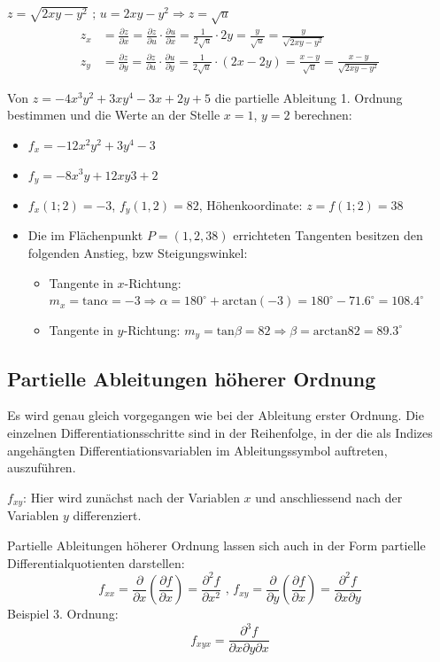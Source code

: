 \begin{bsp}
$z = \sqrt{2xy -y^2} \text{ ;  } u = 2xy - y^2 \Rightarrow z = \sqrt{u}$
\begin{align*}
	z_x &= \frac{\partial z}{\partial x} = \frac{\partial z}{\partial u} \cdot \frac{\partial u}{\partial x} = \frac{1}{2 \sqrt{u}} \cdot 2y = \frac{y}{\sqrt{u}} = \frac{y}{\sqrt{2xy-y^2}} \\
	z_y &= \frac{\partial z}{\partial y} = \frac{\partial z}{\partial u} \cdot \frac{\partial u}{\partial y} = \frac{1}{2 \sqrt{u}} \cdot (2x-2y) = \frac{x-y}{\sqrt{u}} = \frac{x-y}{\sqrt{2xy-y^2}}
\end{align*}
\end{bsp}

\begin{bsp}
Von  $ z = -4x^3y^2 + 3xy^4 - 3x +2y +5$ die partielle Ableitung 1. Ordnung bestimmen und die Werte an der Stelle $x=1$, $y=2$ berechnen:
\begin{itemize}
		\item $f_x= -12x^2y^2+3y^4-3$
		\item $f_y = -8x^3y + 12xy3 +2$
		\item $f_x(1;2) = -3$, $f_y(1,2) = 82$, Höhenkoordinate: $z = f(1;2) = 38$
		\item Die im Flächenpunkt $P = (1, 2, 38)$ errichteten Tangenten besitzen den folgenden Anstieg, bzw Steigungswinkel:
		\begin{itemize}
			\item Tangente in $x$-Richtung: $m_x = \text{tan} \alpha = -3 \Rightarrow \alpha = 180^\circ + \text{arctan}(-3) = 180^\circ - 71.6^\circ = 108.4^\circ$
			\item Tangente in $y$-Richtung: $m_y =  \text{tan} \beta = 82 \Rightarrow \beta = \text{arctan} 82 = 89.3^\circ$
		\end{itemize}
\end{itemize}
\end{bsp}

\subsection{Partielle Ableitungen höherer Ordnung}
\begin{definition}
Es wird genau gleich vorgegangen wie bei der Ableitung erster Ordnung. Die einzelnen Differentiationsschritte sind in der Reihenfolge, in der die als Indizes angehängten Differentiationsvariablen im Ableitungssymbol auftreten, auszuführen. 

$f_{xy}$: Hier wird zunächst nach der Variablen $x$ und anschliessend nach der Variablen $y$ differenziert.

Partielle Ableitungen höherer Ordnung lassen sich auch in der Form partielle Differentialquotienten darstellen:
$$
f_{xx} = \frac{\partial}{\partial x} \left( \frac{\partial f}{\partial x} \right) = \frac{\partial^2 f}{\partial x^2} 
\text{ , } 
f_{xy} = \frac{\partial}{\partial y} \left( \frac{\partial f}{\partial x} \right) = \frac{\partial^2 f}{\partial x \partial y} 
$$
Beispiel 3. Ordnung:
$$ f_{xyx} = \frac{\partial^3 f}{\partial x \partial y \partial x} $$
\end{definition}

